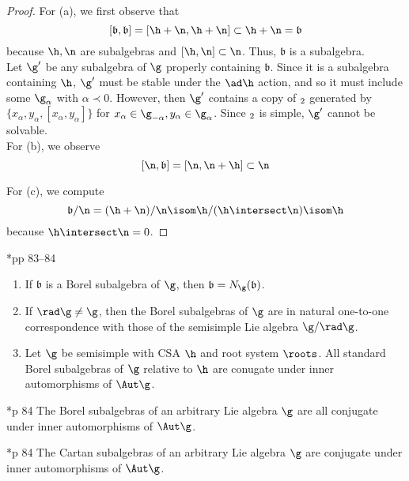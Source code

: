 \documentclass[11pt,leqno,oneside]{amsart}
\numberwithin{thm}{section}
\renewcommand{\b}{\mathfrak{b}}
\begin{document}
\begin{proof}
  For (a), we first observe that \[
    [\b,\b] = [\h+\n, \h+\n] \subset \h+\n = \b
  \]
  because \(\h,\n\) are subalgebras and \([\h,\n] \subset \n\). Thus,
  \(\b\) is a subalgebra.\\

  Let \(\g'\) be any subalgebra of \(\g\) properly containing
  \(\b\). Since it is a subalgebra containing \(\h\), \(\g'\) must be
  stable under the \(\ad \h\) action, and so it must include some
  \(\g_\alpha\) with \(\alpha \prec 0\). However, then \(\g'\)
  contains a copy of \(\sl_2\) generated by \(\{x_\alpha, y_\alpha,
  [x_\alpha,y_\alpha]\}\) for \(x_\alpha \in \g_{-\alpha}, y_\alpha
  \in \g_\alpha\). Since \(\sl_2\) is simple, \(\g'\) cannot be
  solvable. \\

  For (b), we observe \[
    [\n,\b] = [\n,\n+\h] \subset \n
  \]

  For (c), we compute \[
    \b/\n = (\h+\n)/\n \isom \h/(\h \intersect \n) \isom \h
  \]
  because \(\h \intersect \n = 0\). 
\end{proof}
\begin{prop}
  \cite{humph}*{pp 83--84}
  \begin{enumerate}
  \item If \(\b\) is a Borel subalgebra of \(\g\), then \(\b =
    N_\g(\b)\).
  \item If \(\rad \g \neq \g\), then the Borel subalgebras of \(\g\)
    are in natural one-to-one correspondence with those of the
    semisimple Lie algebra \(\g / \rad \g\).
  \item Let \(\g\) be semisimple with CSA \(\h\) and root system
    \(\roots\). All standard Borel subalgebras of \(\g\) relative to
    \(\h\) are conugate under inner automorphisms of \(\Aut \g\).
  \end{enumerate}
\end{prop}
\begin{thm}
  \cite{humph}*{p 84} The Borel subalgebras of an arbitrary Lie algebra \(\g\) are all
  conjugate under inner automorphisms of \(\Aut \g\).
\end{thm}
\begin{cor}
  \cite{humph}*{p 84} The Cartan subalgebras of an arbitrary Lie algebra \(\g\) are
  conjugate under inner automorphisms of \(\Aut \g\).
\end{cor}
\end{document}
